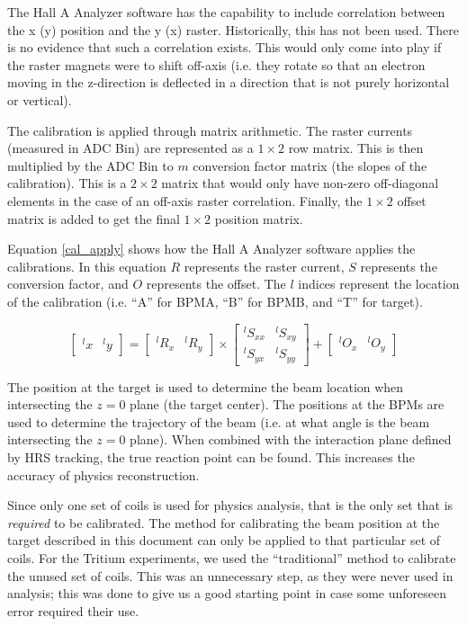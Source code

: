 The Hall A Analyzer software has the capability to include correlation between the x (y) position and the y (x) raster. Historically, this has not been used. There is no evidence that such a correlation exists. This would only come into play if the raster magnets were to shift off-axis (i.e. they rotate so that an electron moving in the z-direction is deflected in a direction that is not purely horizontal or vertical).

The calibration is applied through matrix arithmetic. The raster currents (measured in ADC Bin) are represented as a $1\times2$ row matrix. This is then multiplied by the ADC Bin to $m$ conversion factor matrix (the slopes of the calibration). This is a $2\times2$ matrix that would only have non-zero off-diagonal elements in the case of an off-axis raster correlation. Finally, the $1\times2$ offset matrix is added to get the final $1\times2$ position matrix.

Equation \ref{cal_apply} shows how the Hall A Analyzer software applies the calibrations. In this equation $R$ represents the raster current, $S$ represents the conversion factor, and $O$ represents the offset. The $l$ indices represent the location of the calibration (i.e. ``A'' for BPMA, ``B'' for BPMB, and ``T'' for target).

\begin{equation}
	\begin{bmatrix}
		^lx & ^ly
	\end{bmatrix}
	=
	\begin{bmatrix}
		^lR_x & ^lR_y
	\end{bmatrix}
	\times
	\begin{bmatrix}
		^lS_{xx} & ^lS_{xy} \\
		^lS_{yx} & ^lS_{yy}
	\end{bmatrix}
	+
	\begin{bmatrix}
		^lO_x & ^lO_y
	\end{bmatrix}
	\label{cal_apply}
\end{equation}

The position at the target is used to determine the beam location when intersecting the $z=0$ plane (the target center). The positions at the BPMs are used to determine the trajectory of the beam (i.e. at what angle is the beam intersecting the $z=0$ plane). When combined with the interaction plane defined by HRS tracking, the true reaction point can be found. This increases the accuracy of physics reconstruction.

Since only one set of coils is used for physics analysis, that is the only set that is \textit{required} to be calibrated. The method for calibrating the beam position at the target described in this document can only be applied to that particular set of coils. For the Tritium experiments, we used the ``traditional'' method to calibrate the unused set of coils. This was an unnecessary step, as they were never used in analysis; this was done to give us a good starting point in case some unforeseen error required their use.

